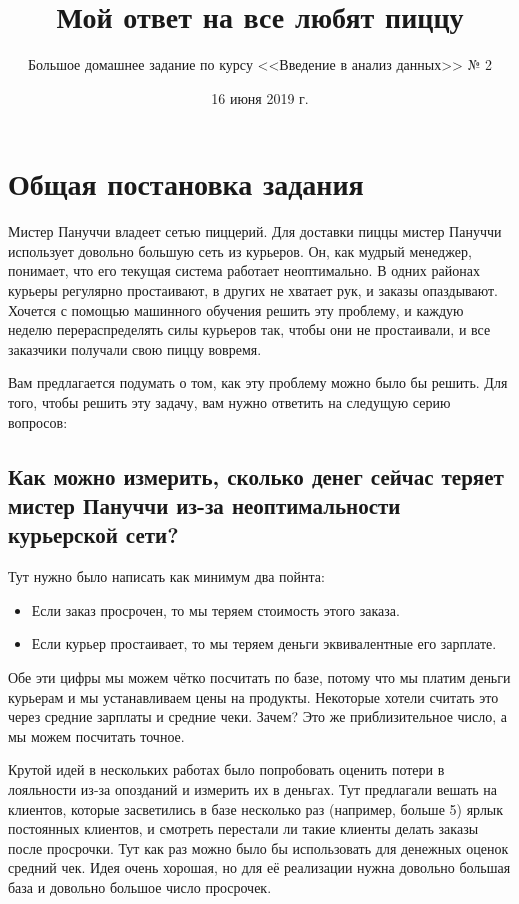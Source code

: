 \documentclass[12pt, a4paper, oneside]{article}
\title{Мой ответ на все любят пиццу}
\author{Большое домашнее задание по курсу <<Введение в анализ данных>> № 2}
\date{16 июня 2019 г.}
\begin{document}
\maketitle

\pagestyle{empty} 

\section*{Общая постановка задания}

Мистер Пануччи владеет сетью пиццерий. Для доставки пиццы мистер Пануччи использует довольно большую сеть из курьеров. Он, как  мудрый менеджер, понимает, что его текущая система работает неоптимально. В одних районах курьеры регулярно простаивают, в других не хватает рук, и заказы опаздывают. Хочется с помощью машинного обучения решить эту проблему, и каждую неделю перераспределять силы курьеров так, чтобы они не простаивали, и все заказчики получали свою пиццу вовремя. 

Вам предлагается подумать о том, как эту проблему можно было бы решить. Для того, чтобы решить эту задачу, вам нужно ответить на следущую серию вопросов: 


\subsection*{Как можно измерить, сколько денег сейчас теряет мистер Пануччи из-за неоптимальности курьерской сети?}

Тут нужно было написать как минимум два пойнта: 

\begin{itemize}
	\item Если заказ просрочен, то мы теряем стоимость этого заказа. 
	\item Если курьер простаивает, то мы теряем деньги эквивалентные его зарплате.
\end{itemize}

Обе эти цифры мы можем чётко посчитать по базе, потому что мы платим деньги курьерам и мы устанавливаем цены на продукты. Некоторые хотели считать это через средние зарплаты и средние чеки. Зачем? Это же приблизительное число, а мы можем посчитать точное. 

Крутой идей в нескольких работах было попробовать оценить потери в лояльности из-за опозданий и измерить их в деньгах. Тут предлагали вешать на клиентов, которые засветились в базе несколько раз (например, больше 5) ярлык постоянных клиентов, и смотреть перестали ли такие клиенты делать заказы после просрочки. Тут как раз можно было бы использовать для денежных оценок средний чек. Идея очень хорошая, но для её реализации нужна довольно большая база и довольно большое число просрочек. 
\end{document}
